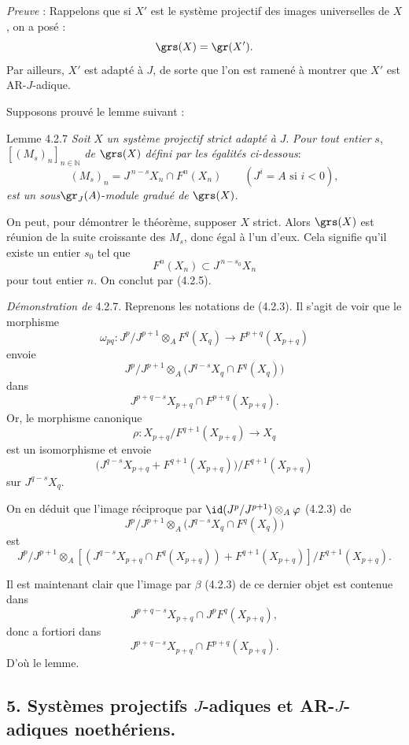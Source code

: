 \emph{Preuve} : Rappelons que si \(X'\) est le système projectif des images universelles de \(X\), on a posé :
\[
\grs(X)=\gr(X').
\]
Par ailleurs, \(X'\) est adapté à \(J\), de sorte que l'on est ramené à montrer que \(X'\) est AR-\(J\)-adique.

Supposons prouvé le lemme suivant :

\begin{statement}{Lemme 4.2.7}
\emph{Soit} \(X\) \emph{un système projectif strict adapté à} \(J\). \emph{Pour tout entier} \(s\),  \([(M_s)_n]_{n\in\mathbb{N}}\) \emph{de} \(\grs(X)\) \emph{défini par les égalités ci-dessous}:
\[
(M_s)_n=J^{\,n-s}X_n\cap F^n(X_n)\qquad(J^i=A\text{ si }i<0),
\]
\emph{est un
sous}\(\gr_J(A)\)-\emph{module gradué de} \(\grs(X)\).
\end{statement}

On peut, pour démontrer le théorème, supposer \(X\) strict. Alors \(\grs(X)\) est réunion de la suite croissante des \(M_s\), donc égal à l'un d'eux. Cela signifie qu'il existe un entier \(s_0\) tel que
\[
F^n(X_n)\subset J^{\,n-s_0}X_n
\]
pour tout entier \(n\). On conclut par (4.2.5).

\emph{Démonstration de} 4.2.7. Reprenons les notations de (4.2.3). Il s'agit de voir que le morphisme
\[
\omega_{pq}:J^p/J^{p+1}\otimes_A F^q(X_q)\longrightarrow F^{p+q}(X_{p+q})
\]
envoie
\[
J^p/J^{p+1}\otimes_A
\bigl(J^{q-s}X_q\cap F^q(X_q)\bigr)
\]
dans
\[
J^{p+q-s}X_{p+q}\cap F^{p+q}(X_{p+q}).
\]
Or, le morphisme canonique
\[
\rho:X_{p+q}/F^{q+1}(X_{p+q})\longrightarrow X_q
\]
est un isomorphisme et envoie
\[
\bigl(J^{q-s}X_{p+q}+F^{q+1}(X_{p+q})\bigr)/F^{q+1}(X_{p+q})
\]
sur \(J^{q-s}X_q\).

On en déduit que l'image réciproque par
\(\id(J^p/J^{p+1})\otimes_A\varphi\) (4.2.3) de
\[
J^p/J^{p+1}\otimes_A
\bigl(J^{q-s}X_q\cap F^q(X_q)\bigr)
\]
est
\[
J^p/J^{p+1}\otimes_A
[(J^{q-s}X_{p+q}\cap F^q(X_{p+q}))+F^{q+1}(X_{p+q})]/F^{q+1}(X_{p+q}).
\]

Il est maintenant clair que l'image par \(\beta\) (4.2.3) de ce dernier objet est contenue dans
\[
J^{p+q-s}X_{p+q}\cap J^pF^q(X_{p+q}),
\]
donc a fortiori dans
\[
J^{p+q-s}X_{p+q}\cap F^{p+q}(X_{p+q}).
\]
D'où le lemme.

\subsection*{5. Systèmes projectifs \(J\)-adiques et AR-\(J\)-adiques noethériens.}

